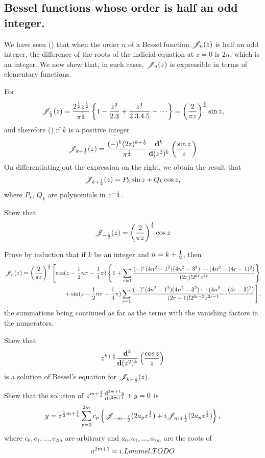 \documentclass{book}
\begin{document}
\subsection{Bessel functions whose order is half an odd integer.}
We have seen () that when the order $n$ of a
Bessel function $\mathscr{J}_n(z)$ is half an odd integer, the difference of the
roots of the indicial equation at $z=0$ is $2n$, which is an integer.
We now shew that, in such cases, $\mathscr{J}_n(z)$ is expressible in terms of
elementary functions.

For 
$$
\besJ_{\half}(z) 
= 
\frac{2^{\half} z^{\half}}{\pi^{\half}}
\thebrace{ 1
  - \frac{z^2}{2.3}
  + \frac{z^4}{2.3.4.5}
  - \cdots
}
= \theparen{ \frac{2}{\pi z}  }^{\half}
\sin z,
$$
and therefore () if $k$ is a
positive integer
$$
\mathscr{J}_{k+\frac{1}{2}}(z)
=
\frac{(-)^k (2z)^{k+\frac{1}{2}}}{\pi^{\frac{1}{2}}}
\frac{\mathbf{d}^k}{\mathbf{d} (z^2)^k}
\left(  \frac{\sin z}{z}   \right)
$$
On differentiating out the expression on the right, we obtain the
result that
$$
\mathscr{J}_{k+\frac{1}{2}}(z) = P_k \sin z + Q_k \cos z,
$$
where $P_k$, $Q_k$ are polynomials in $z^{-\frac{1}{2}}$.
\begin{wandwexample}
  Shew that
  $$
  \mathscr{J}_{-\frac{1}{2}}(z) = \left(  \frac{2}{\pi z} \right)^{\frac{1}{2}} \cos z
  $$
\end{wandwexample}
% 
% 
\begin{wandwexample}
  Prove by induction that if $k$ be an integer and $n = k + \frac{1}{2}$,
  then
  \begin{align*}
    \mathscr{J}_n(z)
    =
    \left( \frac{2}{\pi z} \right)^{\frac{1}{2}}
    \left[
      \cos(z - \frac{1}{2} n \pi - \frac{1}{4}\pi)
      \left\{ 
        1
        +
        \sum_{r=1}
        \frac{(-)^r (4n^2-1^2)(4n^2-3^2)\cdots(4n^2-(4r-1)^2)}{(2r)! 2^{6r} z^{2r}}
       \right\}
    \right.
    \\
    \left.
      +
      \sin(z - \frac{1}{2} n \pi - \frac{1}{4}\pi)
      \sum_{r=1}
      \frac{(-)^r (4n^2-1^2)(4n^2-3^2)\cdots(4n^2-(4r-3)^2)}{(2r-1)!
        2^{6r-3} z^{2r-1}}
    \right],
  \end{align*}
  the summations being continued as far as the terms with the
  vanishing factors in the numerators.
\end{wandwexample}
\begin{wandwexample}
  Shew that
  $$
  z^{k+\frac{1}{2}} \frac{\mathbf{d}^k}{\mathbf{d} (z^2)^k} \left( \frac{\cos z}{z} \right)
  $$
  is a solution of Bessel's equation for $\mathscr{J}_{k+\frac{1}{2}}(z)$.
\end{wandwexample}
\begin{wandwexample}
  Shew that the solution of
  $
  z^{m+\frac{1}{2}} \frac{\mathbf{d}^{2m+1} y}{\mathbf{d} z^{2m+1}} + y = 0
  $
  is
  $$
  y
  =
  z^{\frac{1}{2} m + \frac{1}{4}}
  \sum_{p=0}^{2m}
  c_p
  \left\{  \mathscr{J}_{-m-\frac{1}{2}}(2a_pz^{\frac{1}{2}}) + i\mathscr{J}_{m+\frac{1}{2}}(2a_pz^{\frac{1}{2}}) \right\},
  $$
  where
  $c_0,c_1,\ldots,c_{2m}$ are arbitrary and
  $a_0,a_1,\ldots,a_{2m}$ are the roots of
  $$a^{2m+1}=i. Lommel. TODO
  $$
\end{wandwexample}
\end{document}
